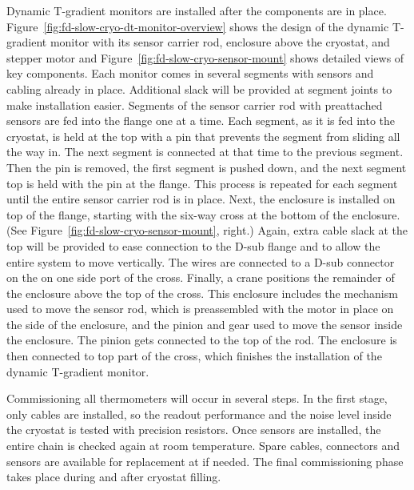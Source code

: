 Dynamic T-gradient monitors %
are installed
after the  components are in place.
Figure~\ref{fig:fd-slow-cryo-dt-monitor-overview} shows the
design of the dynamic T-gradient monitor with its sensor carrier rod,
enclosure above the cryostat, and stepper motor and 
 Figure~\ref{fig:fd-slow-cryo-sensor-mount} shows detailed views of key
components.  Each monitor %
comes in several segments with sensors
and cabling already in place. Additional slack will be provided at
segment joints to make installation easier. Segments of the sensor
carrier rod with preattached sensors %
are fed into the flange one
at a time. Each segment, as it is fed into the %
cryostat, is %
held at the top with a pin that prevents the segment from sliding all
the way in. %
The next segment %
is connected at that
time to the previous segment. Then the pin %
is removed, the first
segment %
is pushed down, and the next segment top %
is held
with the pin at the flange. This process %
is repeated for each
segment %
until the entire sensor carrier rod is in
place.  Next, the enclosure %
is installed on top of the flange,
starting with the six-way cross at the bottom of the enclosure.  (See
 Figure~\ref{fig:fd-slow-cryo-sensor-mount}, right.)  Again, extra cable
slack at the top will be provided to ease connection to the D-sub
flange and to allow the entire system to move vertically.  The wires
are connected to a D-sub connector on the \fdth on one side port
of the cross. Finally, a crane %
positions the remainder
of the enclosure above the top of the cross.  This enclosure includes
the mechanism used to move the sensor rod, which %
is preassembled
with the motor in place on the side of the enclosure, and the pinion
and gear used to move the sensor inside the enclosure.  The pinion
gets connected to the top of the rod. The enclosure is then %
connected to top part of the cross, which finishes the installation of
the dynamic T-gradient monitor.

Commissioning all thermometers will occur in several steps. In the first stage, only cables %
are installed, so
the readout performance and the noise level inside the cryostat %
is tested with precision resistors. Once sensors are installed, the entire chain %
is checked again at room temperature.
Spare cables, connectors and sensors are available for replacement at  if needed. 
The final commissioning phase %
takes place during and after cryostat filling.  


